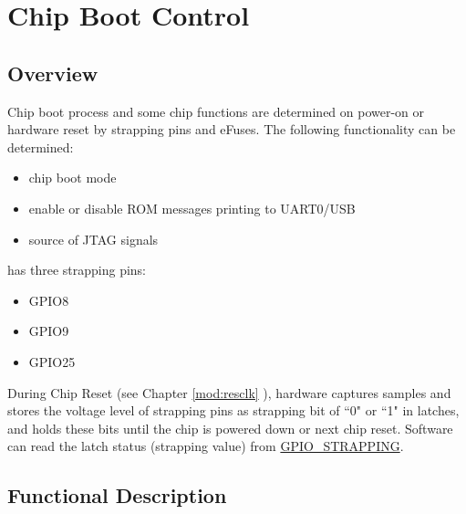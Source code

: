 \documentclass[main\_\_EN.tex]{subfiles}
\begin{document}

\ifglobal
\else
    {\let\clearpage\relax \listoftodos}
    {\let\clearpage\relax \listofdonetodos}
    \tableofcontents
\fi



\hypertarget{bootctrl}{}
\chapter{Chip Boot Control}
\label{mod:bootctrl}


\section{Overview}

Chip boot process and some chip functions are determined on power-on or hardware reset by strapping pins and eFuses. The following functionality can be determined:
\begin{itemize}
    \item chip boot mode
    \item enable or disable ROM messages printing to UART0/USB
    \item source of JTAG signals

\end{itemize}

\chipname{} has three strapping pins:
\begin{itemize}
    \item GPIO8
    \item GPIO9
    \item GPIO25
\end{itemize}

During Chip Reset (see Chapter \ref{mod:resclk} \textit{}), hardware captures samples and stores the voltage level of strapping pins as strapping bit of ``0" or ``1" in latches, and holds these bits until the chip is powered down or next chip reset. Software can read the latch status (strapping value) from \hyperref[fielddesc:GPIOSTRAPPING]{GPIO\_STRAPPING}.







\section{Functional Description}
\end{document}
